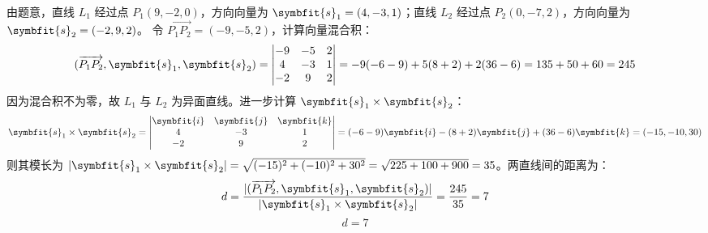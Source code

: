 \begin{solution}
    由题意，直线 $L_1$ 经过点 $P_1(9, -2, 0)$，方向向量为 $\symbfit{s}_1 = (4, -3, 1)$；直线 $L_2$ 经过点 $P_2(0, -7, 2)$，方向向量为 $\symbfit{s}_2 = (-2, 9, 2)$。
    令 $\overrightarrow{P_1P_2} = (-9, -5, 2)$，计算向量混合积：
    \begin{equation}
        (\overrightarrow{P_1P_2}, \symbfit{s}_1, \symbfit{s}_2) = \begin{vmatrix} -9 & -5 & 2 \\ 4 & -3 & 1 \\ -2 & 9 & 2 \end{vmatrix} = -9(-6 - 9) + 5(8 + 2) + 2(36 - 6) = 135 + 50 + 60 = 245
    \end{equation}
    因为混合积不为零，故 $L_1$ 与 $L_2$ 为异面直线。进一步计算 $\symbfit{s}_1 \times \symbfit{s}_2$：
    \begin{equation}
        \symbfit{s}_1 \times \symbfit{s}_2 = \begin{vmatrix} \symbfit{i} & \symbfit{j} & \symbfit{k} \\ 4 & -3 & 1 \\ -2 & 9 & 2 \end{vmatrix} = (-6 - 9)\symbfit{i} - (8 + 2)\symbfit{j} + (36 - 6)\symbfit{k} = (-15, -10, 30)
    \end{equation}
    则其模长为 $|\symbfit{s}_1 \times \symbfit{s}_2| = \sqrt{(-15)^2 + (-10)^2 + 30^2} = \sqrt{225 + 100 + 900} = 35$。两直线间的距离为：
    \begin{equation}
        d = \frac{|(\overrightarrow{P_1P_2}, \symbfit{s}_1, \symbfit{s}_2)|}{|\symbfit{s}_1 \times \symbfit{s}_2|} = \frac{245}{35} = 7
    \end{equation}
    \begin{equation}
        \boxed{d = 7}
    \end{equation}


\end{solution}

